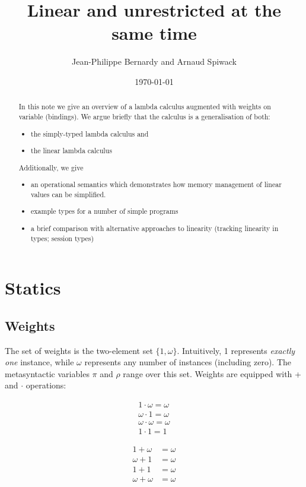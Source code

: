 \documentclass[11pt]{article}
\author{Jean-Philippe Bernardy and Arnaud Spiwack}
\date{\today}
\title{Linear and unrestricted at the same time}
\begin{document}
\maketitle
\begin{abstract}
\noindent
In this note we give an overview of a lambda calculus augmented with
weights on variable (bindings). We argue briefly that the calculus is
a generalisation of both:
\begin{itemize}
\item the simply-typed lambda calculus and
\item the linear lambda calculus
\end{itemize}
%
Additionally, we give
\begin{itemize}
\item an operational semantics which demonstrates how memory
  management of linear values can be simplified.
\item example types for a number of simple programs
\item a brief comparison with alternative approaches to linearity
  (tracking linearity in types; session types)
\end{itemize}
\end{abstract}

\section{Statics}
\label{sec:orgheadline8}
\subsection{Weights}
\label{sec:orgheadline1}

The set of weights is the two-element set $\{1,ω\}$. Intuitively, 1
represents \emph{exactly one} instance, while $ω$ represents any number of
instances (including zero).  The metasyntactic variables \(π\) and \(ρ\)
range over this set. Weights are equipped with + and $·$ operations:


\begin{align*}
1 · ω = ω \\
ω · 1 = ω \\
ω · ω = ω \\
1 · 1 = 1
\end{align*}

\begin{align*}
1 + ω &= ω \\
ω + 1 &= ω \\
1 + 1 &= ω \\
ω + ω &= ω
\end{align*}
\end{document}
